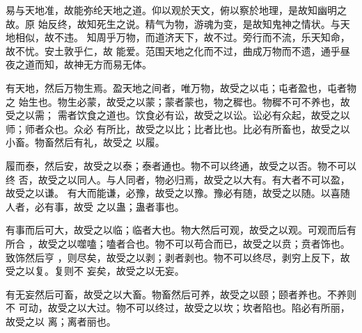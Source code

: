 {易与天地准，故能弥纶天地之道。仰以观於天文，俯以察於地理，是故知幽明之故。原
	始反终，故知死生之说。精气为物，游魂为变，是故知鬼神之情状。与天地相似，故不违。
	知周乎万物，而道济天下，故不过。旁行而不流，乐天知命，故不忧。安土敦乎仁，故
	能爱。范围天地之化而不过，曲成万物而不遗，通乎昼夜之道而知，故神无方而易无体。}

{有天地，然后万物生焉。盈天地之间者，唯万物，故受之以屯；屯者盈也，屯者物之
	始生也。物生必蒙，故受之以蒙；蒙者蒙也，物之穉也。物穉不可不养也，故受之以需；
	需者饮食之道也。饮食必有讼，故受之以讼。讼必有众起，故受之以师；师者众也。众必
	有所比，故受之以比；比者比也。比必有所畜也，故受之以小畜。物畜然后有礼，故受之
	以履。}

{履而泰，然后安，故受之以泰；泰者通也。物不可以终通，故受之以否。物不可以终
	否，故受之以同人。与人同者，物必归焉，故受之以大有。有大者不可以盈，故受之以谦。
	有大而能谦，必豫，故受之以豫。豫必有随，故受之以随。以喜随人者，必有事，故受
	之以蛊；蛊者事也。}

{有事而后可大，故受之以临；临者大也。物大然后可观，故受之以观。可观而后有所合
	，故受之以噬嗑；嗑者合也。物不可以苟合而已，故受之以贲；贲者饰也。致饰然后亨
	，则尽矣，故受之以剥；剥者剥也。物不可以终尽，剥穷上反下，故受之以复。复则不
	妄矣，故受之以无妄。}

{有无妄然后可畜，故受之以大畜。物畜然后可养，故受之以颐；颐者养也。不养则不
	可动，故受之以大过。物不可以终过，故受之以坎；坎者陷也。陷必有所丽，故受之以
	离；离者丽也。}

